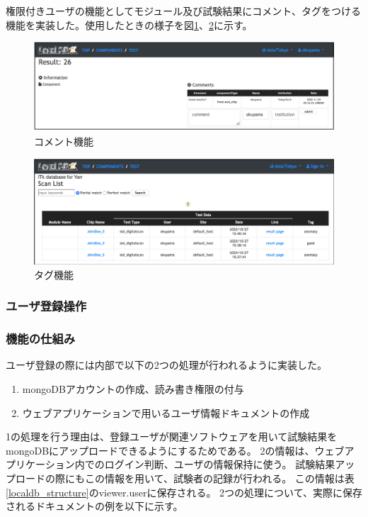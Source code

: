 権限付きユーザの機能としてモジュール及び試験結果にコメント、タグをつける機能を実装した。使用したときの様子を図\ref{webapp_comment}、\ref{webapp_tag}に示す。

\begin{figure}[bpt]\centering
\includegraphics[width=12cm]{viewer_comment}
\caption[コメント機能]{コメント機能}
\label{webapp_comment}
\end{figure}

\begin{figure}[bpt]\centering
\includegraphics[width=12cm]{viewer_tag}
\caption[タグ機能]{タグ機能}
\label{webapp_tag}
\end{figure}

\subsubsection{ユーザ登録操作}


\subsubsection{機能の仕組み}
ユーザ登録の際には内部で以下の2つの処理が行われるように実装した。

\begin{enumerate}
  \item mongoDBアカウントの作成、読み書き権限の付与
  \item ウェブアプリケーションで用いるユーザ情報ドキュメントの作成
\end{enumerate}

1の処理を行う理由は、登録ユーザが関連ソフトウェアを用いて試験結果をmongoDBにアップロードできるようにするためである。
2の情報は、ウェブアプリケーション内でのログイン判断、ユーザの情報保持に使う。
試験結果アップロードの際にもこの情報を用いて、試験者の記録が行われる。
この情報は表\ref{localdb_structure}のviewer.userに保存される。
2つの処理について、実際に保存されるドキュメントの例を以下に示す。

